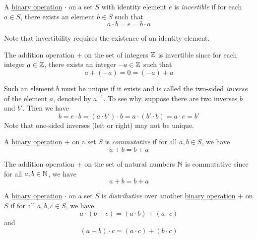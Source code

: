 \begin{definition}[Invertible]\label{def:invertible}
  A \hyperref[def:binary_operation]{binary operation} $\cdot$ on a set $S$ with identity element $e$ is \emph{invertible} if for each $a \in S$, there exists an element $b \in S$ such that
  \[ a \cdot b = e = b \cdot a \]
\end{definition}

\begin{remark}
  Note that invertibility requires the existence of an identity element.
\end{remark}

\begin{example}
  The addition operation $+$ on the set of integers $\operatorname{\mathbb{Z}}$ is invertible since for each integer $a \in \operatorname{\mathbb{Z}}$, there exists an integer $-a \in \operatorname{\mathbb{Z}}$ such that
  \[ a + (-a) = 0 = (-a) + a \]
\end{example}

\begin{remark}
  Such an element $b$ must be unique if it exists and is called the two-sided \emph{inverse} of the element $a$, denoted by $a^{-1}$. To see why, suppose there are two inverses $b$ and $b'$. Then we have
  \[ b = e \cdot b = (a \cdot b') \cdot b = a \cdot (b' \cdot b) = a \cdot e = b' \]
  Note that one-sided inverses (left or right) may not be unique.
\end{remark}

\begin{definition}[Commutative]\label{def:commutative}
  A \hyperref[def:binary_operation]{binary operation} $+$ on a set $S$ is \emph{commutative} if for all $a, b \in S$, we have
  \[ a + b = b + a \]
\end{definition}

\begin{example}
  The addition operation $+$ on the set of natural numbers $\operatorname{\mathbb{N}}$ is commutative since for all $a, b \in \operatorname{\mathbb{N}}$, we have
  \[ a + b = b + a \]
\end{example}

\begin{definition}[Distributive]\label{def:distributive}
  A \hyperref[def:binary_operation]{binary operation} $\cdot$ on a set $S$ is \emph{distributive} over another \hyperref[def:binary_operation]{binary operation} $+$ on $S$ if for all $a, b, c \in S$, we have
  \[ a \cdot (b + c) = (a \cdot b) + (a \cdot c) \]
  and
  \[ (a + b) \cdot c = (a \cdot c) + (b \cdot c) \]
\end{definition}

